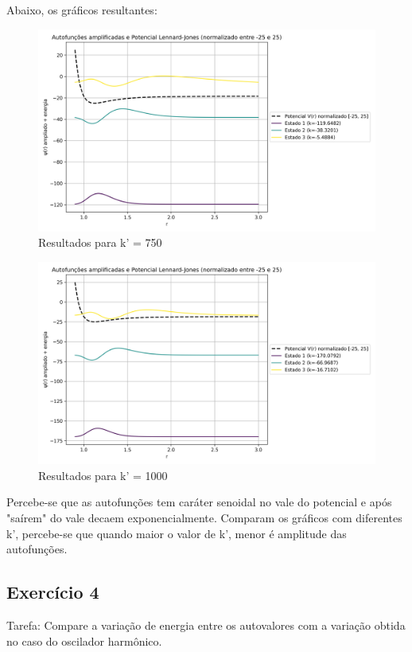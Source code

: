 \documentclass[12pt, a4paper]{article} %
\begin{document}
            Abaixo, os gr\'aficos resultantes:

            \begin{figure}[H]
                \centering
                \includegraphics[scale=0.7]{../images/ex3-results-750.png}
                \caption{Resultados para k' = 750}
            \end{figure}
            \begin{figure}[H]
                \centering
                \includegraphics[scale=0.7]{../images/ex3-results-1000.png}
                \caption{Resultados para k' = 1000}
            \end{figure}

            Percebe-se que as autofun\c{c}\~oes tem car\'ater senoidal no vale do potencial e ap\'os "sa\'irem" do vale decaem exponencialmente.
            Comparam os gr\'aficos com diferentes k', percebe-se que quando maior o valor de k', menor \'e amplitude das autofun\c{c}\~oes.

        \subsection{Exerc\'icio 4}

            Tarefa: Compare a varia\c{c}\~ao de energia entre os autovalores com a varia\c{c}\~ao obtida no caso do oscilador harm\^onico.
\end{document}
